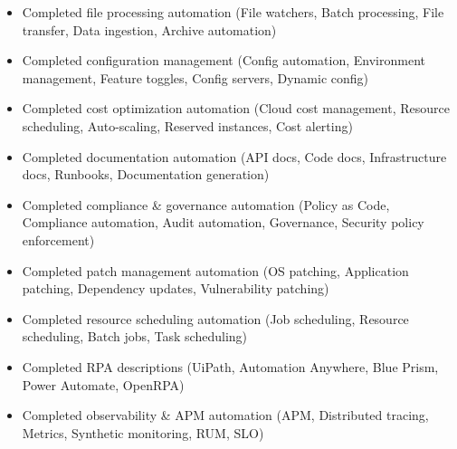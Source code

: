 \documentclass[11pt,a4paper]{article}
\begin{document}
\begin{itemize}
\item Completed file processing automation (File watchers, Batch processing, File transfer, Data ingestion, Archive automation)
\end{itemize}

\begin{itemize}
\item Completed configuration management (Config automation, Environment management, Feature toggles, Config servers, Dynamic config)
\end{itemize}

\begin{itemize}
\item Completed cost optimization automation (Cloud cost management, Resource scheduling, Auto-scaling, Reserved instances, Cost alerting)
\end{itemize}

\begin{itemize}
\item Completed documentation automation (API docs, Code docs, Infrastructure docs, Runbooks, Documentation generation)
\end{itemize}

\begin{itemize}
\item Completed compliance & governance automation (Policy as Code, Compliance automation, Audit automation, Governance, Security policy enforcement)
\end{itemize}

\begin{itemize}
\item Completed patch management automation (OS patching, Application patching, Dependency updates, Vulnerability patching)
\end{itemize}

\begin{itemize}
\item Completed resource scheduling automation (Job scheduling, Resource scheduling, Batch jobs, Task scheduling)
\end{itemize}

\begin{itemize}
\item Completed RPA descriptions (UiPath, Automation Anywhere, Blue Prism, Power Automate, OpenRPA)
\end{itemize}

\begin{itemize}
\item Completed observability & APM automation (APM, Distributed tracing, Metrics, Synthetic monitoring, RUM, SLO)
\end{itemize}
\end{document}
